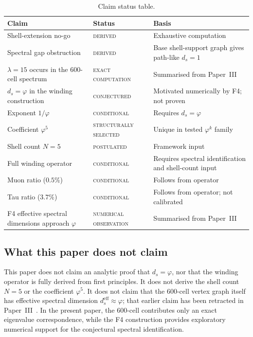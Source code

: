 \documentclass[12pt]{article}
\newcommand{\phig}{\varphi}
\newcommand{\ds}{d_s}
\newcommand{\dseff}{d_s^{\mathrm{eff}}}
\begin{document}
\begin{table}[ht]
\centering
\caption{Claim status table.}
\label{tab:status}
\begin{tabular}{@{}lll@{}}
\toprule
Claim & Status & Basis \\
\midrule
Shell-extension no-go & \textsc{derived} & Exhaustive computation \\
Spectral gap obstruction & \textsc{derived} & Base shell-support graph gives path-like $\ds = 1$ \\
$\lambda = 15$ occurs in the 600-cell spectrum & \textsc{exact computation} & Summarised from Paper~III \\
$\ds = \phig$ in the winding construction & \textsc{conjectured} & Motivated numerically by F4; not proven \\
Exponent $1/\phig$ & \textsc{conditional} & Requires $\ds = \phig$ \\
Coefficient $\phig^5$ & \textsc{structurally selected} & Unique in tested $\phig^k$ family \\
Shell count $N = 5$ & \textsc{postulated} & Framework input \\
Full winding operator & \textsc{conditional} & Requires spectral identification and shell-count input \\
Muon ratio ($0.5\%$) & \textsc{conditional} & Follows from operator \\
Tau ratio ($3.7\%$) & \textsc{conditional} & Follows from operator; not calibrated \\
F4 effective spectral dimensions approach $\phig$ & \textsc{numerical observation} & Summarised from Paper~III \\
\bottomrule
\end{tabular}
\end{table}

\subsection*{What this paper does not claim}

This paper does not claim an analytic proof that $\ds = \phig$, nor that the winding operator is fully derived from first principles. It does not derive the shell count $N = 5$ or the coefficient $\phig^5$. It does not claim that the 600-cell vertex graph itself has effective spectral dimension $\dseff \approx \phig$; that earlier claim has been retracted in Paper~III~\citep{SmartIII}. In the present paper, the 600-cell contributes only an exact eigenvalue correspondence, while the F4 construction provides exploratory numerical support for the conjectural spectral identification.
\end{document}
